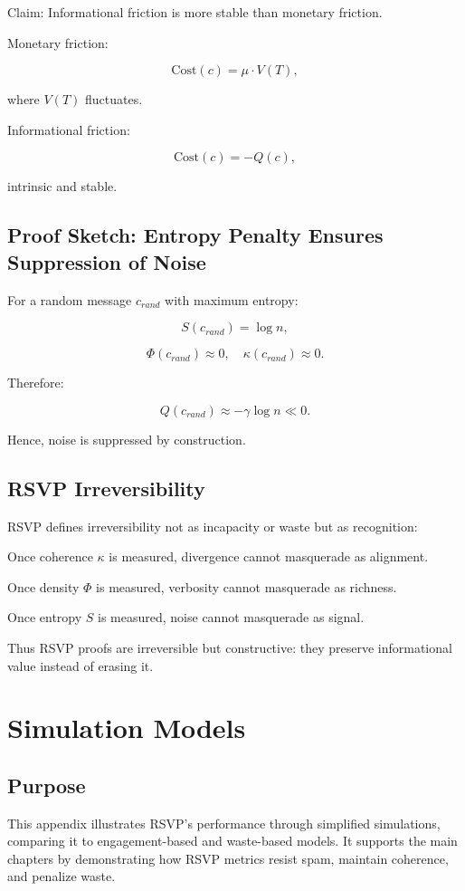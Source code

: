 \documentclass{book}
\begin{document}
Claim: Informational friction is more stable than monetary friction.

Monetary friction:

\[ \text{Cost}(c) = \mu \cdot V(T), \]

where \( V(T) \) fluctuates.

Informational friction:

\[ \text{Cost}(c) = -Q(c), \]

intrinsic and stable.

\section{Proof Sketch: Entropy Penalty Ensures Suppression of Noise}

For a random message \( c_{rand} \) with maximum entropy:

\[ S(c_{rand}) = \log n, \]

\[ \Phi(c_{rand}) \approx 0, \quad \kappa(c_{rand}) \approx 0. \]

Therefore:

\[ Q(c_{rand}) \approx -\gamma \log n \ll 0. \]

Hence, noise is suppressed by construction.

\section{RSVP Irreversibility}

RSVP defines irreversibility not as incapacity or waste but as recognition:

Once coherence \( \kappa \) is measured, divergence cannot masquerade as alignment.

Once density \( \Phi \) is measured, verbosity cannot masquerade as richness.

Once entropy \( S \) is measured, noise cannot masquerade as signal.

Thus RSVP proofs are irreversible but constructive: they preserve informational value instead of erasing it.

\chapter{Simulation Models}

\section{Purpose}

This appendix illustrates RSVP’s performance through simplified simulations, comparing it to engagement-based and waste-based models. It supports the main chapters by demonstrating how RSVP metrics resist spam, maintain coherence, and penalize waste.
\end{document}
